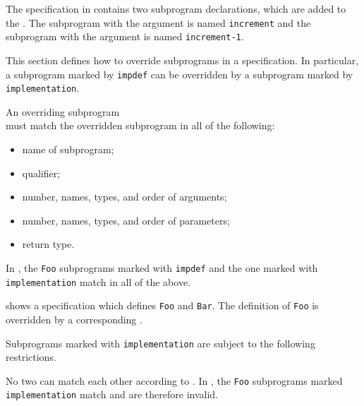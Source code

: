 The specification in 
contains two subprogram declarations,
which are added to the \staticenvironmentterm{}.
The subprogram with the \integertypeterm{} argument is named \verb|increment|
and the subprogram with the \realtypeterm{} argument is named \verb|increment-1|.


This section defines how to override subprograms in a specification.
In particular, a subprogram marked by \texttt{impdef} can be overridden by a subprogram marked by \\
\texttt{implementation}.

An overriding \Proseimplementationsubprogram{} subprogram \\
must match the overridden \Proseimpdefsubprogram{} subprogram in all of the following:
\begin{itemize}
  \item name of subprogram;
  \item qualifier;
  \item number, names, types, and order of arguments;
  \item number, names, types, and order of parameters;
  \item return type.
\end{itemize}
In , the \verb|Foo| subprograms marked with \texttt{impdef} and the one marked with \texttt{implementation} match in all of the above.

 shows a specification which defines \Proseimpdefsubprograms{} \verb|Foo| and \verb|Bar|.
The definition of \verb|Foo| is overridden by a corresponding \Proseimplementationsubprogram{}.

\noindent
Subprograms marked with \texttt{implementation} are subject to the following restrictions.

No two \Proseimplementationsubprograms{} can \linebreak[3]
match each other according to .
In , the \verb|Foo| subprograms marked \texttt{implementation}
match and are therefore invalid.

